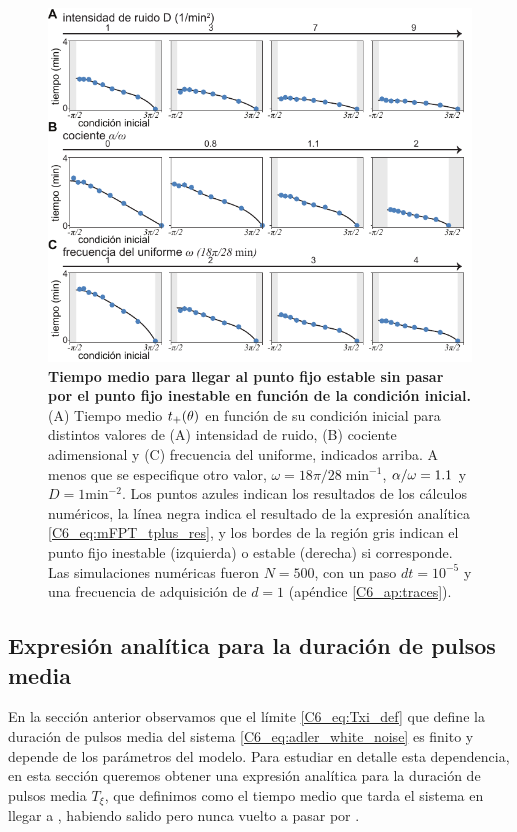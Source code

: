 \documentclass[./main.tex]{subfiles}
\begin{document}
\begin{figure}
    \centering
    \includegraphics[width=1\columnwidth]{figures/chapter6/C6_t_plus.pdf} 
    \caption{\textbf{Tiempo medio para llegar al punto fijo estable sin pasar por el punto fijo inestable en función de la condición inicial.} (A) Tiempo medio $t_{+}(\theta)$ en función de su condición inicial \xx para distintos valores de (A) intensidad de ruido, (B) cociente adimensional \dddelta y (C) frecuencia del uniforme, indicados arriba. A menos que se especifique otro valor, $\omega = 18\pi/28 \; \text{min}^{-1}$, $\alpha/\omega = 1.1$ y $D=1 \text{min}^{-2}$. Los puntos azules indican los resultados de los cálculos numéricos, la línea negra indica el resultado de la expresión analítica \ref{C6_eq:mFPT_tplus_res}, y los bordes de la región gris indican el punto fijo inestable (izquierda) o estable (derecha) si corresponde. Las simulaciones numéricas fueron $N=500$, con un paso $dt = 10^{-5}$ y una frecuencia de adquisición de $d=1$ (apéndice \ref{C6_ap:traces}).}
    \label{C6_fig:mFPT_tplus}
\end{figure}

\subsection{Expresión analítica para la duración de pulsos media}

En la sección anterior observamos que el límite \ref{C6_eq:Txi_def} que define la duración de pulsos media del sistema \ref{C6_eq:adler_white_noise} es finito y depende de los parámetros del modelo. Para estudiar en detalle esta dependencia, en esta sección queremos obtener una expresión analítica para la duración de pulsos media $T_\xi$, que definimos como el tiempo medio que tarda el sistema en llegar a \xxe, habiendo salido pero nunca vuelto a pasar por \xxi.
\end{document}
